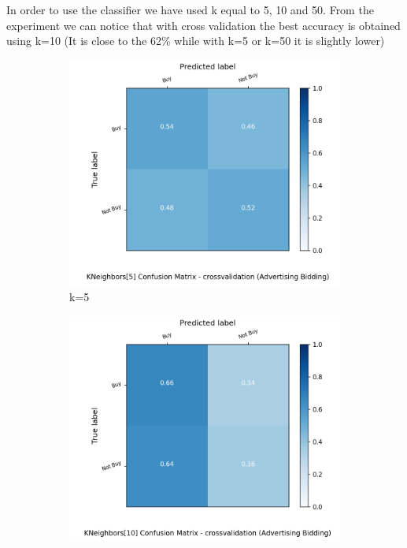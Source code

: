 \documentclass{article}
\begin{document}
\noindent In order to use the classifier we have used k equal to 5, 10 and 50.
From the experiment we can notice that with cross validation the best accuracy is obtained using k=10 (It is close to the 62\% while with k=5 or k=50 it is slightly lower)


\begin{figure}[H]
	\centering
	\begin{subfigure}{.5\textwidth}
		\centering
		\includegraphics[width=1.1\textwidth]{Plots/conv_KNeighbors_5_balance_True_crossvalidation}
		\caption{k=5}
	\end{subfigure}%
	\begin{subfigure}{.5\textwidth}
		\centering
		\includegraphics[width=1.1\textwidth]{Plots/conv_KNeighbors_10_balance_True_crossvalidation}

\end{subfigure}
\end{figure}
\end{document}
